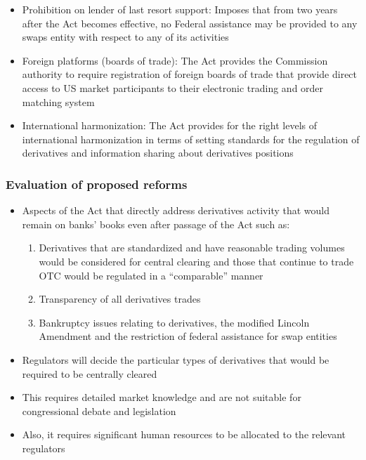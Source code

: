 \documentclass[11pt]{beamer}
\begin{document}
\begin{frame}
\begin{itemize}
\item Prohibition on lender of last resort support: Imposes that from two years after the Act becomes effective, no Federal assistance may be provided to any swaps entity with respect to any of its activities
\item Foreign platforms (boards of trade): The Act provides the Commission authority to require registration of foreign boards of trade that provide direct access to US market participants to their electronic trading and order matching system
\item International harmonization: The Act provides for the right levels of international harmonization in terms of setting standards for the regulation of derivatives and information sharing about derivatives positions
\end{itemize}
\end{frame}

\begin{frame}
\frametitle{Evaluation of proposed reforms}
\begin{itemize}
\item Aspects of the Act that directly address derivatives activity that would remain on banks’ books even after passage of the Act such as:
\begin{enumerate}
\item Derivatives that are standardized and have reasonable trading volumes would be considered for central clearing and those that continue to trade OTC would be regulated in a “comparable” manner
\item Transparency of all derivatives trades
\item Bankruptcy issues relating to derivatives, the modified Lincoln Amendment and the restriction of federal assistance for swap entities
\end{enumerate}
\end{itemize}
\end{frame}

\begin{frame}
\begin{itemize}
\item Regulators will decide the particular types of derivatives that would be required to be centrally cleared
\item This requires detailed market knowledge and are not suitable for congressional debate and legislation
\item Also, it requires significant human resources to be allocated to the relevant regulators
\end{itemize}
\end{frame}
\end{document}
